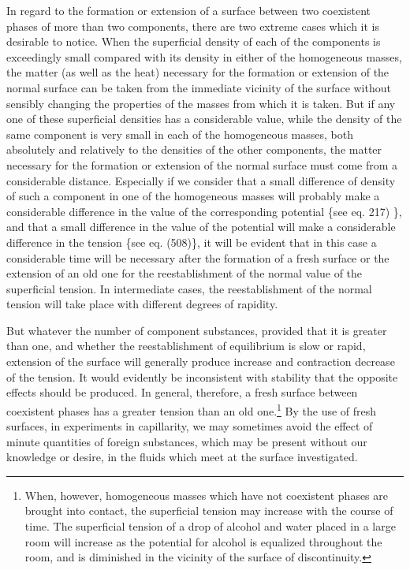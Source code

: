 \documentclass[12pt]{memoir}
\begin{document}
{In regard to the formation or extension of a surface between two coexistent phases of more than two components, there are two extreme cases which it is desirable to notice. When the superficial density of each of the components is exceedingly small compared with its density in either of the homogeneous masses, the matter (as well as the heat) necessary for the formation or extension of the normal surface can be taken from the immediate vicinity of the surface without sensibly changing the properties of the masses from which it is taken. But if any one of these superficial densities has a considerable value, while the density of the same component is very small in each of the homogeneous masses, both absolutely and relatively to the densities of the other components, the matter necessary for the formation or extension of the normal surface must come from a considerable distance. Especially if we consider that a small difference of density of such a component in one of the homogeneous masses will probably make a considerable difference in the value of the corresponding potential \{see eq. 217) \}, and that a small difference in the value of the potential will make a considerable difference in the tension \{see eq. (508)\}, it will be evident that in this case a considerable time will be necessary after the formation of a fresh surface or the extension of an old one for the reestablishment of the normal value of the superficial tension. In intermediate cases, the reestablishment of the normal tension will take place with different degrees of rapidity.

But whatever the number of component substances, provided that it is greater than one, and whether the reestablishment of equilibrium is slow or rapid, extension of the surface will generally produce increase and contraction decrease of the tension. It would evidently be inconsistent with stability that the opposite effects should be produced. In general, therefore, a fresh surface between coexistent phases has a greater tension than an old one.\footnote{When, however, homogeneous masses which have not coexistent phases are brought into contact, the superficial tension may increase with the course of time. The superficial tension of a drop of alcohol and water placed in a large room will increase as the potential for alcohol is equalized throughout the room, and is diminished in the vicinity of the surface of discontinuity.}
By the use of fresh surfaces, in experiments in capillarity, we may sometimes avoid the effect of minute quantities of foreign substances, which may be present without our knowledge or desire, in the fluids which meet at the surface investigated.

}
\end{document}
